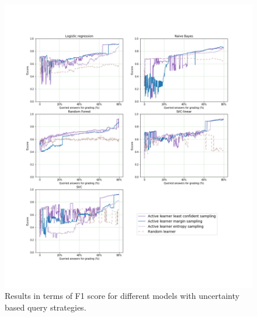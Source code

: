 \begin{figure}[!htb]
	\centering
	\includegraphics[scale=0.45]{images/task4_f1score_uncertainty}
	\caption{Results in terms of F1 score for different models with uncertainty based query strategies.}
	\label{t4_m_uncertainty_f1}
\end{figure}


